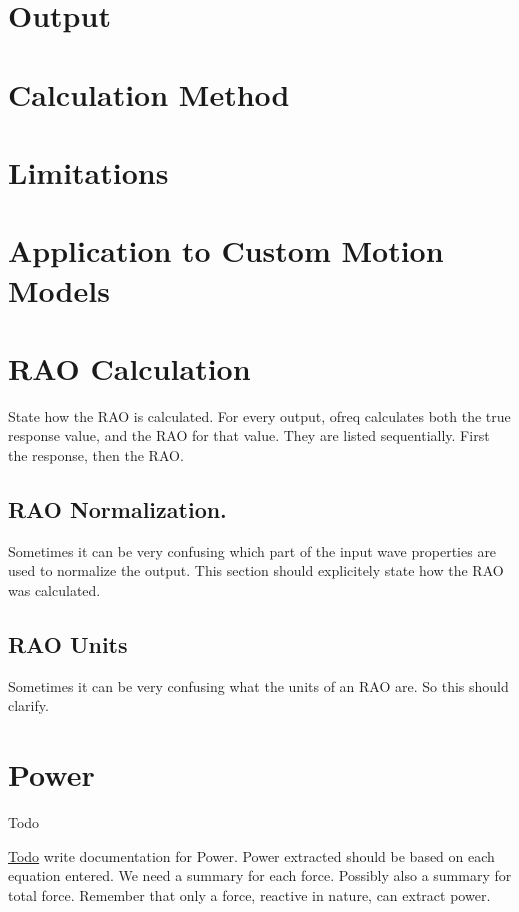 \section*{Output}

\section*{Calculation Method}

\section*{Limitations}

\section*{Application to Custom Motion Models}

\section*{R\-A\-O Calculation}

State how the R\-A\-O is calculated. For every output, ofreq calculates both the true response value, and the R\-A\-O for that value. They are listed sequentially. First the response, then the R\-A\-O.

\subsection*{R\-A\-O Normalization.}

Sometimes it can be very confusing which part of the input wave properties are used to normalize the output. This section should explicitely state how the R\-A\-O was calculated.

\subsection*{R\-A\-O Units}

Sometimes it can be very confusing what the units of an R\-A\-O are. So this should clarify. \hypertarget{power}{}\section{Power}\label{power}
\begin{DoxyRefDesc}{Todo}
\item[\hyperlink{todo__todo000024}{Todo}]write documentation for Power. Power extracted should be based on each equation entered. We need a summary for each force. Possibly also a summary for total force. Remember that only a force, reactive in nature, can extract power.\end{DoxyRefDesc}


